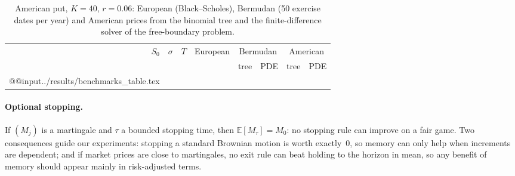 \begin{table}[ht]
\centering\small
\caption{American put, $K=40$, $r=0.06$: European (Black--Scholes), Bermudan (50 exercise
dates per year) and American prices from the binomial tree and the finite-difference
solver of the free-boundary problem.}
\label{tab:benchmarks}
\begin{tabular}{rrr r rr rr}
\toprule
$S_0$ & $\sigma$ & $T$ & European & \multicolumn{2}{c}{Bermudan} & \multicolumn{2}{c}{American}\\
 & & & & tree & PDE & tree & PDE\\
\midrule
\csname @@input\endcsname ../results/benchmarks_table.tex
\bottomrule
\end{tabular}
\end{table}

\paragraph{Optional stopping.}
If $(M_j)$ is a martingale and $\tau$ a bounded stopping time, then
$\mathbb E[M_\tau]=M_0$: no stopping rule can improve on a fair game. Two consequences
guide our experiments: stopping a standard Brownian motion is worth exactly~$0$, so memory
can only help when increments are dependent; and if market prices are close to
martingales, no exit rule can beat holding to the horizon in mean, so any benefit of
memory should appear mainly in risk-adjusted terms.
